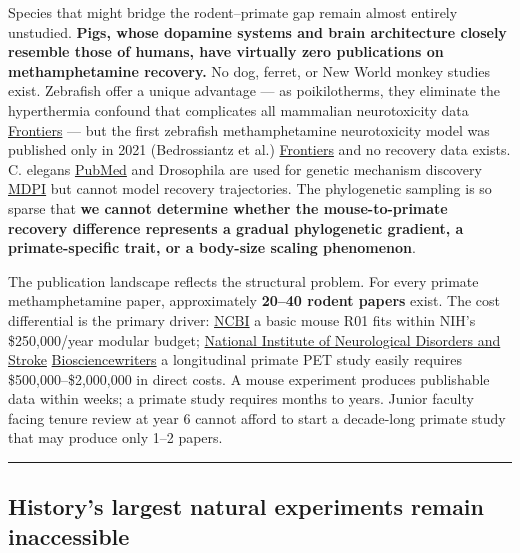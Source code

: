 Species that might bridge the rodent--primate gap remain almost entirely unstudied. \textbf{Pigs, whose dopamine systems and brain architecture closely resemble those of humans, have virtually zero publications on methamphetamine recovery.} No dog, ferret, or New World monkey studies exist. Zebrafish offer a unique advantage --- as poikilotherms, they eliminate the hyperthermia confound that complicates all mammalian neurotoxicity data \href{https://www.frontiersin.org/journals/pharmacology/articles/10.3389/fphar.2022.976970/full}{Frontiers} --- but the first zebrafish methamphetamine neurotoxicity model was published only in 2021 (Bedrossiantz et al.) \href{https://www.frontiersin.org/journals/pharmacology/articles/10.3389/fphar.2021.770319/full}{Frontiers} and no recovery data exists. C. elegans \href{https://pubmed.ncbi.nlm.nih.gov/26810004/}{PubMed} and Drosophila are used for genetic mechanism discovery \href{https://www.mdpi.com/2227-9059/10/1/119}{MDPI} but cannot model recovery trajectories. The phylogenetic sampling is so sparse that \textbf{we cannot determine whether the mouse-to-primate recovery difference represents a gradual phylogenetic gradient, a primate-specific trait, or a body-size scaling phenomenon}.

The publication landscape reflects the structural problem. For every primate methamphetamine paper, approximately \textbf{20--40 rodent papers} exist. The cost differential is the primary driver: \href{https://www.ncbi.nlm.nih.gov/books/NBK100126/}{NCBI} a basic mouse R01 fits within NIH's \$250,000/year modular budget; \href{https://www.ninds.nih.gov/funding/preparing-your-application/preparing-budget/creating-budget}{National Institute of Neurological Disorders and Stroke} \href{https://biosciencewriters.com/Should-I-Apply-for-an-R01-R03-or-R21-NIH-Grant-Award.aspx}{Biosciencewriters} a longitudinal primate PET study easily requires \$500,000--\$2,000,000 in direct costs. A mouse experiment produces publishable data within weeks; a primate study requires months to years. Junior faculty facing tenure review at year 6 cannot afford to start a decade-long primate study that may produce only 1--2 papers.

\begin{center}\rule{0.5\linewidth}{0.5pt}\end{center}

\subsection{History's largest natural experiments remain inaccessible}\label{14_what_we_dont_know-historys-largest-natural-experiments-remain-inaccessible}


